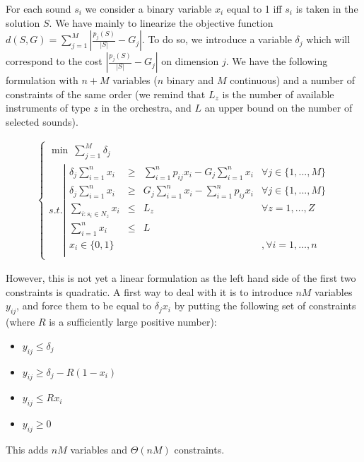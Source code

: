 \documentclass[a4paper]{book}
\begin{document}
For each sound $s_i$ we consider a binary variable $x_i$ equal to 1 iff $s_i$ is taken in the solution $S$.
We have mainly to linearize the objective function $d(S,G)=\sum_{j=1}^M \left| \frac{p_j(S)}{|S|} - G_j\right|$. To do so, we introduce a variable $\delta_j$ which will correspond to the cost $| \frac{p_j(S)}{|S|} - G_j|$ on dimension $j$. We have the following formulation with $n+M$ variables ($n$ binary and $M$ continuous) and a number of constraints of the same order (we remind that $L_z$ is the number of available instruments of type $z$ in the orchestra, and $L$ an upper bound on the number of selected sounds). 




\begin{center}
   \begin{eqnarray*}
     \ \left \{ \begin{array}{ll}
    \min \ \sum\limits_{j=1}^M \delta_j \\
    s.t. \left |
    \begin{array}{llllll}
    \delta_j \sum_{i=1}^n x_i & \geq & \sum\limits_{i=1}^n p_{ij}x_i-G_j\sum_{i=1}^n x_i  & \forall{j} \in \{1,...,M\} \\
    \delta_j  \sum_{i=1}^n x_i  & \geq &G_j\sum_{i=1}^n x_i - \sum\limits_{i=1}^n p_{ij}x_i  & \forall{j} \in \{1,...,M\} \\
         \sum\limits_{i:s_i\in N_z}  x_{i} & \leq &L_z & \forall z=1,\dots,Z \\
                  \sum\limits_{i=1}^n  x_{i} & \leq &L &  \\
 
    x_{i} \in \{0,1\} & & &, \forall{i}=1,\dots,n\\
    \end{array}
    \right.
    \end{array} 
    \right.
    \end{eqnarray*}
    \end{center}

However, this is not yet a linear formulation as the left hand side of the first two constraints is quadratic. A first way to deal with it is to introduce $nM$ variables $y_{ij}$, and force them to be equal to $\delta_j x_i$ by putting the following set of constraints (where $R$ is a sufficiently large positive number):
\begin{itemize}
    \item $y_{ij}\leq \delta_j$
    \item $y_{ij}\geq \delta_j-R(1-x_i)$
    \item $y_{ij}\leq Rx_i$
    \item $y_{ij}\geq 0$
\end{itemize}
This adds $nM$ variables and $\Theta(nM)$ constraints. 
\end{document}

